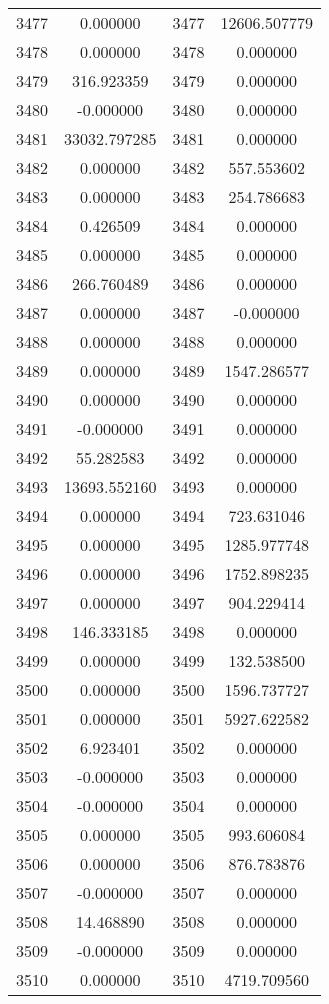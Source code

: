 \documentclass[12pt]{article}
\begin{document}
\begin{longtable}{@{}cccc@{}}
3477 & 0.000000 & 3477 & 12606.507779 \\
3478 & 0.000000 & 3478 & 0.000000 \\
3479 & 316.923359 & 3479 & 0.000000 \\
3480 & -0.000000 & 3480 & 0.000000 \\
3481 & 33032.797285 & 3481 & 0.000000 \\
3482 & 0.000000 & 3482 & 557.553602 \\
3483 & 0.000000 & 3483 & 254.786683 \\
3484 & 0.426509 & 3484 & 0.000000 \\
3485 & 0.000000 & 3485 & 0.000000 \\
3486 & 266.760489 & 3486 & 0.000000 \\
3487 & 0.000000 & 3487 & -0.000000 \\
3488 & 0.000000 & 3488 & 0.000000 \\
3489 & 0.000000 & 3489 & 1547.286577 \\
3490 & 0.000000 & 3490 & 0.000000 \\
3491 & -0.000000 & 3491 & 0.000000 \\
3492 & 55.282583 & 3492 & 0.000000 \\
3493 & 13693.552160 & 3493 & 0.000000 \\
3494 & 0.000000 & 3494 & 723.631046 \\
3495 & 0.000000 & 3495 & 1285.977748 \\
3496 & 0.000000 & 3496 & 1752.898235 \\
3497 & 0.000000 & 3497 & 904.229414 \\
3498 & 146.333185 & 3498 & 0.000000 \\
3499 & 0.000000 & 3499 & 132.538500 \\
3500 & 0.000000 & 3500 & 1596.737727 \\
3501 & 0.000000 & 3501 & 5927.622582 \\
3502 & 6.923401 & 3502 & 0.000000 \\
3503 & -0.000000 & 3503 & 0.000000 \\
3504 & -0.000000 & 3504 & 0.000000 \\
3505 & 0.000000 & 3505 & 993.606084 \\
3506 & 0.000000 & 3506 & 876.783876 \\
3507 & -0.000000 & 3507 & 0.000000 \\
3508 & 14.468890 & 3508 & 0.000000 \\
3509 & -0.000000 & 3509 & 0.000000 \\
3510 & 0.000000 & 3510 & 4719.709560 \\

\end{longtable}
\end{document}
